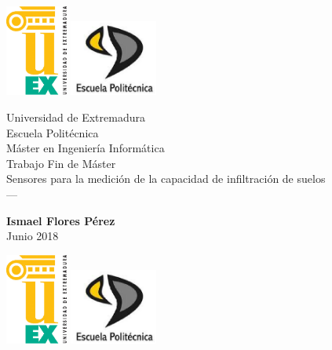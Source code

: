 \setlength{\unitlength}{1 cm} %
\thispagestyle{empty}

\begin{center}
\includegraphics[height=3cm]{IMGS/LOGO_UNEX.eps} \hspace*{8cm}
\includegraphics[height=2.5cm]{IMGS/LOGO_EPCC.eps}
\vspace*{1cm}
\end{center}


\begin{center}
{\huge Universidad de Extremadura}\\[0.5cm]
{\LARGE Escuela Politécnica}\\[1.25cm]
{\Large Máster en Ingeniería Informática}\\[1.25cm]
{\Large Trabajo Fin de Máster}\\[2.5cm]
{\huge Sensores para la medición de la capacidad de infiltración de suelos\\\vspace*{0.3cm}
---}\\[2cm]
\end{center}

\begin{flushright}
\vspace*{1cm}
{\large \textbf{Ismael Flores Pérez}}\\
{\large Junio 2018}\\
\end{flushright}



\newpage

\thispagestyle{empty}

\begin{center}
\includegraphics[height=3cm]{IMGS/LOGO_UNEX.eps} \hspace*{8cm}
\includegraphics[height=2.5cm]{IMGS/LOGO_EPCC.eps}
\vspace*{0.7cm}
\end{center}


